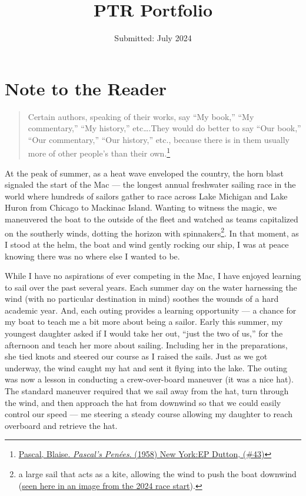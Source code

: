 \documentclass[
  letterpaper,
  DIV=11,
  numbers=noendperiod]{scrreprt}
\title{PTR Portfolio}
\author{}
\date{Submitted: July 2024}
\renewcommand*\contentsname{Table of contents}
\newcommand\contentsname{Table of contents}
\begin{document}
\maketitle

\renewcommand*\contentsname{Table of contents}
{
\hypersetup{linkcolor=}
\setcounter{tocdepth}{2}
\tableofcontents
}

\chapter*{Note to the Reader}\label{note-to-the-reader}


\begin{quote}
Certain authors, speaking of their works, say ``My book,'' ``My
commentary,'' ``My history,'' etc\ldots.They would do better to say
``Our book,'' ``Our commentary,'' ``Our history,'' etc., because there
is in them usually more of other people's than their own.\footnote{\href{https://www.gutenberg.org/files/18269/18269-h/18269-h.htm\#p_43}{Pascal,
  Blaise. \emph{Pascal's Penées}. (1958) New York:EP Dutton, (\#43)}}
\end{quote}

At the peak of summer, as a heat wave enveloped the country, the horn
blast signaled the start of the Mac --- the longest annual freshwater
sailing race in the world where hundreds of sailors gather to race
across Lake Michigan and Lake Huron from Chicago to Mackinac Island.
Wanting to witness the magic, we maneuvered the boat to the outside of
the fleet and watched as teams capitalized on the southerly winds,
dotting the horizon with spinnakers\footnote{a large sail that acts as a
  kite, allowing the wind to push the boat downwind
  (\href{https://drive.google.com/file/d/1NrW5GJNlNJxoZi73NggF7sHlc6oJlpdx/view?usp=sharing}{seen
  here in an image from the 2024 race start}).}. In that moment, as I
stood at the helm, the boat and wind gently rocking our ship, I was at
peace knowing there was no where else I wanted to be.

While I have no aspirations of ever competing in the Mac, I have enjoyed
learning to sail over the past several years. Each summer day on the
water harnessing the wind (with no particular destination in mind)
soothes the wounds of a hard academic year. And, each outing provides a
learning opportunity --- a chance for my boat to teach me a bit more
about being a sailor. Early this summer, my youngest daughter asked if I
would take her out, ``just the two of us,'' for the afternoon and teach
her more about sailing. Including her in the preparations, she tied
knots and steered our course as I raised the sails. Just as we got
underway, the wind caught my hat and sent it flying into the lake. The
outing was now a lesson in conducting a crew-over-board maneuver (it was
a nice hat). The standard maneuver required that we sail away from the
hat, turn through the wind, and then approach the hat from downwind so
that we could easily control our speed --- me steering a steady course
allowing my daughter to reach overboard and retrieve the hat.
\end{document}
